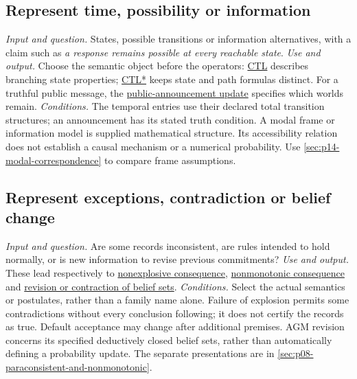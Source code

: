 \subsection{Represent time, possibility or information}
\label{sec:p14-finder-modality}
\textit{Input and question.} States, possible transitions or information
alternatives, with a claim such as \emph{a response remains possible at every
reachable state}.
\textit{Use and output.} Choose the semantic object before the operators:
\hyperref[def:p08-ctl-semantics]{CTL} describes branching state properties;
\hyperref[def:p08-ctl-star-semantics]{CTL*} keeps state and path formulas
distinct. For a truthful public message, the
\hyperref[def:p08-public-announcement]{public-announcement update} specifies
which worlds remain.
\textit{Conditions.} The temporal entries use their declared total transition
structures; an announcement has its stated truth condition. A modal frame or
information model is supplied mathematical structure. Its accessibility
relation does not establish a causal mechanism or a numerical probability.
Use \cref{sec:p14-modal-correspondence} to compare frame assumptions.

\subsection{Represent exceptions, contradiction or belief change}
\label{sec:p14-finder-defeasibility}
\textit{Input and question.} Are some records inconsistent, are rules intended
to hold normally, or is new information to revise previous commitments?
\textit{Use and output.} These lead respectively to
\hyperref[def:p08-paraconsistency]{nonexplosive consequence},
\hyperref[def:p08-nonmonotonic]{nonmonotonic consequence} and
\hyperref[def:p08-agm]{revision or contraction of belief sets}.
\textit{Conditions.} Select the actual semantics or postulates, rather than a
family name alone. Failure of explosion permits some contradictions without
every conclusion following; it does not certify the records as true. Default
acceptance may change after additional premises. AGM revision concerns its
specified deductively closed belief sets, rather than automatically defining
a probability update. The separate presentations are in
\cref{sec:p08-paraconsistent-and-nonmonotonic}.

